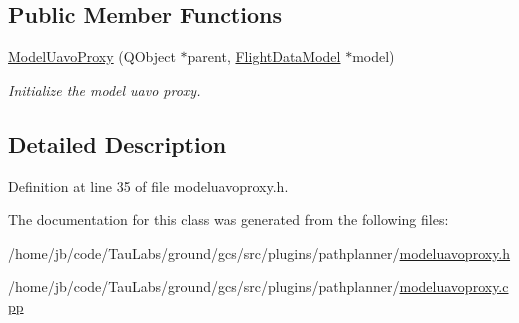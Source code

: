 \subsection*{\-Public \-Member \-Functions}
\begin{DoxyCompactItemize}
\item 
\hyperlink{group___o_p_map_plugin_ga42f653c17585ad777a3b74b7c561cfaa}{\-Model\-Uavo\-Proxy} (\-Q\-Object $\ast$parent, \hyperlink{class_flight_data_model}{\-Flight\-Data\-Model} $\ast$model)
\begin{DoxyCompactList}\small\item\em \-Initialize the model uavo proxy. \end{DoxyCompactList}\end{DoxyCompactItemize}


\subsection{\-Detailed \-Description}


\-Definition at line 35 of file modeluavoproxy.\-h.



\-The documentation for this class was generated from the following files\-:\begin{DoxyCompactItemize}
\item 
/home/jb/code/\-Tau\-Labs/ground/gcs/src/plugins/pathplanner/\hyperlink{modeluavoproxy_8h}{modeluavoproxy.\-h}\item 
/home/jb/code/\-Tau\-Labs/ground/gcs/src/plugins/pathplanner/\hyperlink{modeluavoproxy_8cpp}{modeluavoproxy.\-cpp}\end{DoxyCompactItemize}
